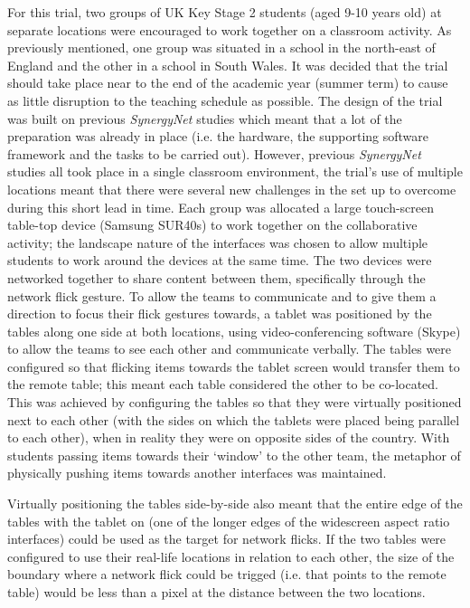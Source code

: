 \documentclass[a4paper,11pt]{article}
\begin{document}
For this trial, two groups of UK Key Stage 2 students (aged 9-10 years old) at separate locations were encouraged to work together on a classroom activity.
As previously mentioned, one group was situated in a school in the north-east of England and the other in a school in South Wales.
It was decided that the trial should take place near to the end of the academic year (summer term) to cause as little disruption to the teaching schedule as possible.
The design of the trial was built on previous {\emph{SynergyNet}} studies which meant that a lot of the preparation was already in place (i.e. the hardware, the supporting software framework and the tasks to be carried out).
However, previous {\emph{SynergyNet}} studies all took place in a single classroom environment, the trial's use of multiple locations meant that there were several new challenges in the set up to overcome during this short lead in time.
Each group was allocated a large touch-screen table-top device (Samsung SUR40s) to work together on the collaborative activity; the landscape nature of the interfaces was chosen to allow multiple students to work around the devices at the same time.
The two devices were networked together to share content between them, specifically through the network flick gesture.
To allow the teams to communicate and to give them a direction to focus their flick gestures towards, a tablet was positioned by the tables along one side at both locations, using video-conferencing software (Skype) to allow the teams to see each other and communicate verbally.
The tables were configured so that flicking items towards the tablet screen would transfer them to the remote table; this meant each table considered the other to be co-located.
This was achieved by configuring the tables so that they were virtually positioned next to each other (with the sides on which the tablets were placed being parallel to each other), when in reality they were on opposite sides of the country.
With students passing items towards their `window' to the other team, the metaphor of physically pushing items towards another interfaces was maintained.

Virtually positioning the tables side-by-side also meant that the entire edge of the tables with the tablet on (one of the longer edges of the widescreen aspect ratio interfaces) could be used as the target for network flicks.
If the two tables were configured to use their real-life locations in relation to each other, the size of the boundary where a network flick could be trigged (i.e. that points to the remote table) would be less than a pixel at the distance between the two locations.
\end{document}
